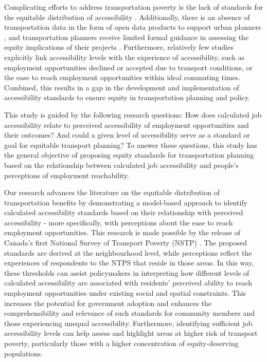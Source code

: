 \documentclass[preprint, 3p,
authoryear]{elsarticle} %
\begin{document}
Complicating efforts to address transportation poverty is the lack of
standards for the equitable distribution of accessibility
\citep{soukhov2025a}. Additionally, there is an absence of
transportation data in the form of open data products to support urban
planners \citep{arribas-bel2021, behrendtfrauke2021, páez2021}, and
transportation planners receive limited formal guidance in assessing the
equity implications of their projects
\citep{miller2018, palm2023, tebrömmelstroet2016}. Furthermore,
relatively few studies explicitly link accessibility levels with the
experience of accessibility, such as employment opportunities declined
or accepted due to transport conditions, or the ease to reach employment
opportunities within ideal commuting times. Combined, this results in a
gap in the development and implementation of accessibility standards to
ensure equity in transportation planning and policy.

This study is guided by the following research questions: How does
calculated job accessibility relate to perceived accessibility of
employment opportunities and their outcomes? And could a given level of
accessibility serve as a standard or goal for equitable transport
planning? To answer these questions, this study has the general
objective of proposing equity standards for transportation planning
based on the relationship between calculated job accessibility and
people's perceptions of employment reachability.

Our research advances the literature on the equitable distribution of
transportation benefits by demonstrating a model-based approach to
identify calculated accessibility standards based on their relationship
with perceived accessibility - more specifically, with perceptions about
the ease to reach employment opportunities. This research is made
possible by the release of Canada's first National Survey of Transport
Poverty (NSTP) \citep{tiznado-aitken}. The proposed standards are
derived at the neighbourhood level, while perceptions reflect the
experiences of respondents to the NTPS that reside in those areas. In
this way, these thresholds can assist policymakers in interpreting how
different levels of calculated accessibility are associated with
residents' perceived ability to reach employment opportunities under
existing social and spatial constraints. This increases the potential
for government adoption and enhances the comprehensibility and relevance
of such standards for community members and those experiencing unequal
accessibility. Furthermore, identifying sufficient job accessibility
levels can help assess and highlight areas at higher risk of transport
poverty, particularly those with a higher concentration of
equity-deserving populations.
\end{document}
